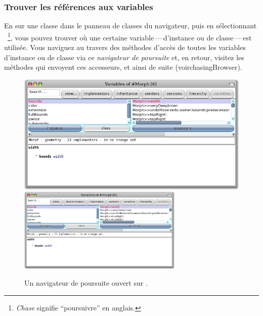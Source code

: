 \documentclass[a4paper,10pt,twoside]{book}
\begin{document}
\subsubsection{Trouver les références aux variables}

En \actclickant sur une classe dans le panneau de classes du
navigateur, puis en sélectionnant
~\footnote{\emph{Chase} signifie
  ``poursuivre'' en anglais.}, vous pouvez trouver 
où une certaine variable\,---\,d'instance ou de classe\,---\,est
utilisée.
Vous naviguez au travers des méthodes d'accès de toutes les variables
d'instance ou de classe via ce \emph{navigateur de poursuite} et, en
retour, visitez les méthodes qui envoyent ces accesseurs, et
ainsi de suite (voir{chasingBrowser}).

\begin{figure}[btp]
	\begin{center}
	\ifluluelse
		{\includegraphics[width=\textwidth]{chasingBrowser}}
		{\includegraphics[width=0.7\textwidth]{chasingBrowser}}
	\end{center}
	\caption{Un navigateur de poursuite ouvert sur .}
\end{figure}

\end{document}
